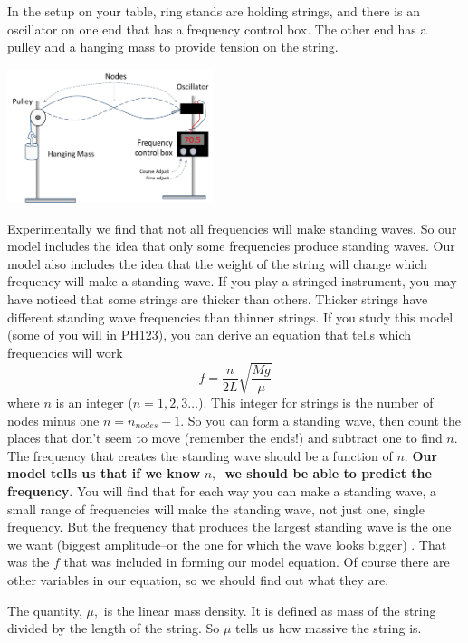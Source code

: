 \documentclass{book}
\begin{document}
In the setup on your table, ring stands are holding strings, and there is an
oscillator on one end that has a frequency control box. The other end has a
pulley and a hanging mass to provide tension on the string.%
\begin{center}
\includegraphics[natheight=1.907800in,natwidth=2.949000in,height=1.5451in,width=2.3753in]{Lab6_figs/StandingWaveonString.png}
\end{center}

Experimentally we find that not all frequencies will make standing waves. So
our model includes the idea that only some frequencies produce standing waves.
Our model also includes the idea that the weight of the string will change
which frequency will make a standing wave. If you play a stringed instrument,
you may have noticed that some strings are thicker than others. Thicker
strings have different standing wave frequencies than thinner strings. If you
study this model (some of you will in PH123), you can derive an equation that
tells which frequencies will work%
\begin{equation}
f=\frac{n}{2L}\sqrt{\frac{Mg}{\mu}}\label{tolinearize}
\end{equation}
where $n$ is an integer ($n=1,2,3\ldots$). This integer for strings is the
number of nodes minus one $n=n_{nodes}-1$. So you can form a standing wave,
then count the places that don't seem to move (remember the ends!) and
subtract one to find $n.$ The frequency that creates the standing wave should
be a function of $n.$ \textbf{Our model tells us that if we know }%
$n,$\textbf{\ we should be able to predict the frequency}. You will find that
for each way you can make a standing wave, a small range of frequencies will
make the standing wave, not just one, single frequency. But the frequency that
produces the largest standing wave is the one we want (biggest amplitude--or
the one for which the wave looks bigger) . That was the $f$ that was included
in forming our model equation. Of course there are other variables in our
equation, so we should find out what they are.

The quantity, $\mu,$ is the linear mass density. It is defined as mass of the
string divided by the length of the string. So $\mu$ tells us how massive the
string is.
\end{document}
